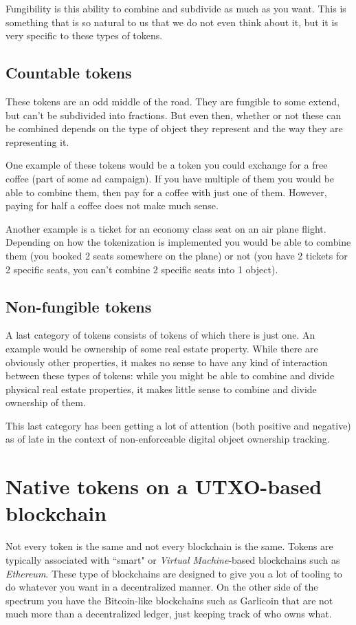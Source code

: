 \documentclass{article}
\begin{document}
Fungibility is this ability to combine and subdivide as much as you want. This is something that is so natural to us that we do not even think about it, but it is very specific to these types of tokens.

\subsection{Countable tokens}

These tokens are an odd middle of the road. They are fungible to some extend, but can't be subdivided into fractions. But even then, whether or not these can be combined depends on the type of object they represent and the way they are representing it.

One example of these tokens would be a token you could exchange for a free coffee (part of some ad campaign). If you have multiple of them you would be able to combine them, then pay for a coffee with just one of them. However, paying for half a coffee does not make much sense.

Another example is a ticket for an economy class seat on an air plane flight. Depending on how the tokenization is implemented you would be able to combine them (you booked 2 seats somewhere on the plane) or not (you have 2 tickets for 2 specific seats, you can't combine 2 specific seats into 1 object).

\subsection{Non-fungible tokens}

A last category of tokens consists of tokens of which there is just one. An example would be ownership of some real estate property. While there are obviously other properties, it makes no sense to have any kind of interaction between these types of tokens: while you might be able to combine and divide physical real estate properties, it makes little sense to combine and divide ownership of them.

This last category has been getting a lot of attention (both positive and negative) as of late in the context of non-enforceable digital object ownership tracking.

\newpage
\section{Native tokens on a UTXO-based blockchain}

Not every token is the same and not every blockchain is the same. Tokens are typically associated with ``smart" or \emph{Virtual Machine}-based blockchains such as \emph{Ethereum}. These type of blockchains are designed to give you a lot of tooling to do whatever you want in a decentralized manner. On the other side of the spectrum you have the Bitcoin-like blockchains such as Garlicoin that are not much more than a decentralized ledger, just keeping track of who owns what.
\end{document}

